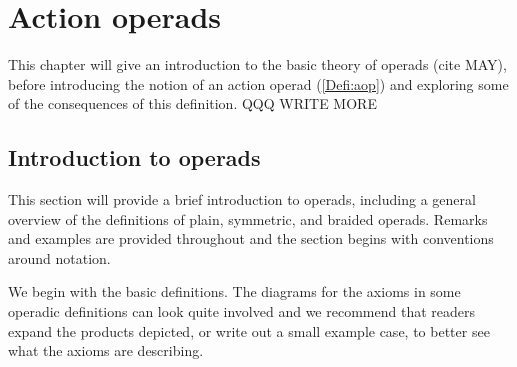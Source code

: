 \section{Action operads}
This chapter will give an introduction to the basic theory of operads (cite MAY), before introducing the notion of an action operad (\ref{Defi:aop}) and exploring some of the consequences of this definition. QQQ WRITE MORE
\subsection{Introduction to operads}
This section will provide a brief introduction to operads, including a general overview of the definitions of plain, symmetric, and braided operads. Remarks and examples are provided throughout and the section begins with conventions around notation.

We begin with the basic definitions. The diagrams for the axioms in some operadic definitions can look quite involved and we recommend that readers expand the products depicted, or write out a small example case, to better see what the axioms are describing.

